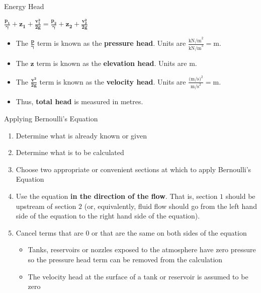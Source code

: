 \documentclass[9pt,xcolor={svgnames, x11names},professionalfonts, mathserif]{beamer}
\begin{document}
\begin{frame}{Energy Head}
	\begin{center}
		\begin{minipage}{0.7\textwidth}
			\begin{mybox}[title=Bernoulli's Equation]
				\centering
				$\bm{ \frac{p_1}{\gamma}+z_1+\frac{v_1^2}{2g}=\frac{p_2}{\gamma}+z_2+\frac{v_2^2}{2g}} $
			\end{mybox}
		\end{minipage}
		\begin{itemize}
			\item The $\bm{\frac{ p}{\gamma}}$ term is known as the \textbf{pressure head}.
			      Units are $\frac{\text{kN/m}^2}{\text{kN/m}^3}=\text{m}$. \pause
			\item The $\bm{z}$ term is known as the \textbf{elevation head}.
			      Units are $\text{m}$. \pause
			\item The $\bm{\frac{v^2}{2g}}$ term is known as the \textbf{velocity head}.
			      Units are $\frac{\text{(m/s)}^2}{\text{m/s}^2}=\text{m}$. \pause
			\item Thus, \textbf{total head} is measured in metres.
		\end{itemize}
	\end{center}
	
\end{frame}


\begin{frame}{Applying Bernoulli's Equation}
	
	\begin{enumerate}
		\item Determine what is already known or given
		\item Determine what is to be calculated
		\item Choose two appropriate or convenient sections at which to apply Bernoulli's Equation
		\item Use the equation \textbf{in the direction of the flow}. That is, section $1$ should be upstream
		      of section $2$ (or, equivalently, fluid flow should go from the left hand side of the equation to the right
		      hand side of the equation).
		\item Cancel terms that are $0$ or that are the same on both sides of the equation
		      \begin{itemize}
		      	\item Tanks, reservoirs or nozzles exposed to the atmosphere have zero pressure so the pressure head term can be removed
		      	      from the calculation
		      	\item The velocity head at the surface of a tank or reservoir is assumed to be zero
		      \end{itemize}
	\end{enumerate}
\end{frame}
\end{document}
